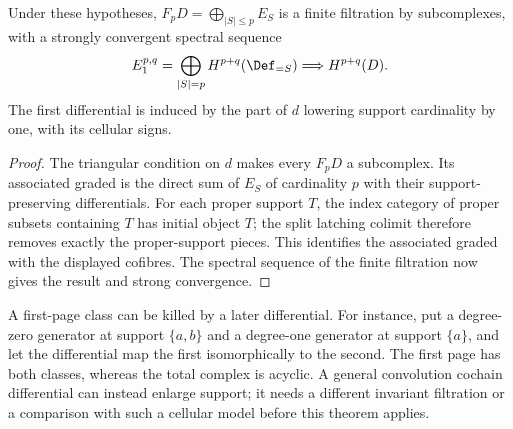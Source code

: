 \begin{theorem}
Under these hypotheses, $F_pD=\bigoplus_{|S|\leq p}E_S$ is a finite
filtration by subcomplexes, with a strongly convergent spectral sequence
\[
 E_1^{p,q}=\bigoplus_{|S|=p}H^{p+q}(\Def_{=S})
             \Longrightarrow H^{p+q}(D).
\]
The first differential is induced by the part of $d$ lowering support
cardinality by one, with its cellular signs.
\end{theorem}
\begin{proof}
The triangular condition on $d$ makes every $F_pD$ a subcomplex. Its
associated graded is the direct sum of $E_S$ of cardinality $p$ with
their support-preserving differentials. For each proper support $T$, the
index category of proper subsets containing $T$ has initial object $T$;
the split latching colimit therefore removes exactly the proper-support
pieces. This identifies the associated graded with the displayed cofibres.
The spectral sequence of the finite filtration now gives the result and
strong convergence.
\end{proof}

A first-page class can be killed by a later differential. For instance,
put a degree-zero generator at support $\{a,b\}$ and a degree-one
generator at support $\{a\}$, and let the differential map the first
isomorphically to the second. The first page has both classes, whereas
the total complex is acyclic. A general convolution cochain differential
can instead enlarge support; it needs a different invariant filtration
or a comparison with such a cellular model before this theorem applies.

